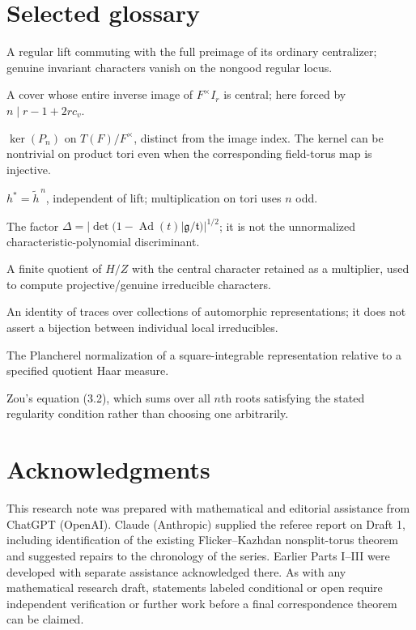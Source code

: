 \documentclass[11pt]{article}
\theoremstyle{plain}
\theoremstyle{definition}
\begin{document}
\section{Selected glossary}\label{sec:glossary}
\begin{description}[style=nextline,leftmargin=3.0cm]
\item[Good element] A regular lift commuting with the full preimage of its ordinary centralizer; genuine invariant characters vanish on the nongood regular locus.
\item[Scalar-central cover] A cover whose entire inverse image of $F^\times I_r$ is central; here forced by $n\mid r-1+2rc_v$.
\item[Power-map kernel] $\ker(P_n)$ on $T(F)/F^\times$, distinct from the image index.  The kernel can be nontrivial on product tori even when the corresponding field-torus map is injective.
\item[Star map] $h^*=\widetilde h^{\,n}$, independent of lift; multiplication on tori uses $n$ odd.
\item[Weyl discriminant] The factor $\Delta=|\det(1-\operatorname{Ad}(t)|\mathfrak g/\mathfrak t)|^{1/2}$; it is not the unnormalized characteristic-polynomial discriminant.
\item[Twisted finite quotient] A finite quotient of $H/Z$ with the central character retained as a multiplier, used to compute projective/genuine irreducible characters.
\item[Packet identity] An identity of traces over collections of automorphic representations; it does not assert a bijection between individual local irreducibles.
\item[Formal degree] The Plancherel normalization of a square-integrable representation relative to a specified quotient Haar measure.
\item[Root-sum relation] Zou's equation (3.2), which sums over all $n$th roots satisfying the stated regularity condition rather than choosing one arbitrarily.
\end{description}

\section*{Acknowledgments}
This research note was prepared with mathematical and editorial
assistance from ChatGPT (OpenAI).  Claude (Anthropic) supplied the
referee report on Draft 1, including identification of the existing
Flicker--Kazhdan nonsplit-torus theorem and suggested repairs to
the chronology of the series.  Earlier Parts I--III were developed
with separate assistance acknowledged there.  As with any
mathematical research draft, statements labeled conditional or open
require independent verification or further work before a final
correspondence theorem can be claimed.
\end{document}
